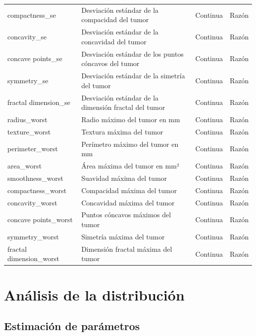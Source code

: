 \documentclass[a4paper, 12pt]{article}
\begin{document}
\begin{table}[ht]
{\begin{tabular}{|p{3.5cm}|p{5.5cm}|p{3.5cm}|p{3.5cm}|}
            compactness\_se & Desviación estándar de la compacidad del tumor & Continua & Razón \\
            concavity\_se & Desviación estándar de la concavidad del tumor & Continua & Razón \\
            concave points\_se & Desviación estándar de los puntos cóncavos del tumor & Continua & Razón \\
            symmetry\_se & Desviación estándar de la simetría del tumor & Continua & Razón \\
            fractal dimension\_se & Desviación estándar de la dimensión fractal del tumor & Continua & Razón \\
            radius\_worst & Radio máximo del tumor en mm & Continua & Razón \\
            texture\_worst & Textura máxima del tumor & Continua & Razón \\
            perimeter\_worst & Perímetro máximo del tumor en mm & Continua & Razón \\
            area\_worst & Área máxima del tumor en mm² & Continua & Razón \\
            smoothness\_worst & Suavidad máxima del tumor & Continua & Razón \\
            compactness\_worst & Compacidad máxima del tumor & Continua & Razón \\
            concavity\_worst & Concavidad máxima del tumor & Continua & Razón \\
            concave points\_worst & Puntos cóncavos máximos del tumor & Continua & Razón \\
            symmetry\_worst & Simetría máxima del tumor & Continua & Razón \\
            fractal dimension\_worst & Dimensión fractal máxima del tumor & Continua & Razón \\
            \hline
        \end{tabular}
    }
\end{table}


\newpage

\section{Análisis de la distribución}


\subsection{Estimación de parámetros}
\end{document}
